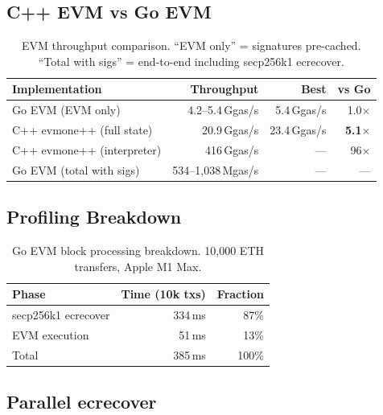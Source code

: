 \documentclass[11pt]{article}
\begin{document}
\subsection{C++ EVM vs Go EVM}

\begin{table}[h]
\centering
\small
\begin{tabular}{lrrr}
\toprule
\textbf{Implementation} & \textbf{Throughput} & \textbf{Best} & \textbf{vs Go} \\
\midrule
Go EVM (EVM only)            & 4.2--5.4\,Ggas/s & 5.4\,Ggas/s  & 1.0$\times$ \\
C++ evmone++ (full state)    & 20.9\,Ggas/s     & 23.4\,Ggas/s & \textbf{5.1$\times$} \\
C++ evmone++ (interpreter)   & 416\,Ggas/s      & ---           & 96$\times$ \\
\midrule
Go EVM (total with sigs)     & 534--1{,}038\,Mgas/s & ---       & --- \\
\bottomrule
\end{tabular}
\caption{EVM throughput comparison. ``EVM only'' = signatures pre-cached.
``Total with sigs'' = end-to-end including secp256k1 ecrecover.}
\label{tab:cpp_go}
\end{table}

\subsection{Profiling Breakdown}

\begin{table}[h]
\centering
\small
\begin{tabular}{lrr}
\toprule
\textbf{Phase} & \textbf{Time (10k txs)} & \textbf{Fraction} \\
\midrule
secp256k1 ecrecover & 334\,ms & 87\% \\
EVM execution       & 51\,ms  & 13\% \\
\midrule
Total               & 385\,ms & 100\% \\
\bottomrule
\end{tabular}
\caption{Go EVM block processing breakdown. 10{,}000 ETH transfers, Apple M1 Max.}
\label{tab:profile}
\end{table}

\subsection{Parallel ecrecover}
\end{document}
